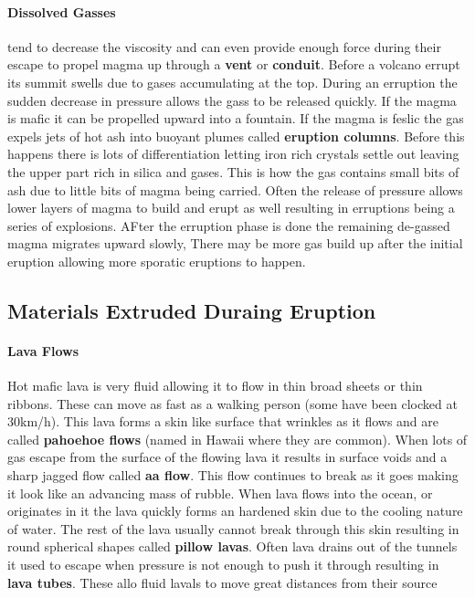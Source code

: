 \documentclass{article}
\begin{document}
\paragraph{Dissolved Gasses} %
\label{par:dissolved_gasses}
tend to decrease the viscosity and can even provide enough force during their escape to propel magma up through a \textbf{vent} or \textbf{conduit}. Before a volcano errupt its summit swells due to gases accumulating at the top. During an erruption the sudden decrease in pressure allows the gass to be released quickly. If the magma is mafic it can be propelled upward into a fountain. If the magma is feslic the gas expels jets of hot ash into buoyant plumes called \textbf{eruption columns}. Before this happens there is lots of differentiation letting iron rich crystals settle out leaving the upper part rich in silica and gases. This is how the gas contains small bits of ash due to little bits of magma being carried. Often the release of pressure allows lower layers of magma to build and erupt as well resulting in erruptions being a series of explosions. AFter the erruption phase is done the remaining de-gassed magma migrates upward slowly, There may be more gas build up after the initial eruption allowing more sporatic eruptions to happen.

\subsection*{Materials Extruded Duraing Eruption} %
\label{sub:materials_extruded_duraing_eruption}
\paragraph{Lava Flows} %
\label{par:lava_flows}
Hot mafic lava is very fluid allowing it to flow in thin broad sheets or thin ribbons. These can move as fast as a walking person (some have been clocked at 30km/h). This lava forms a skin like surface that wrinkles as it flows and are called \textbf{pahoehoe flows} (named in Hawaii where they are common). When lots of gas escape from the surface of the flowing lava it results in surface voids and a sharp jagged flow called \textbf{aa flow}. This flow continues to break as it goes making it look like an advancing mass of rubble. When lava flows into the ocean, or originates in it the lava quickly forms an hardened skin due to the cooling nature of water. The rest of the lava usually cannot break through this skin resulting in round spherical shapes called \textbf{pillow lavas}. Often lava drains out of the tunnels it used to escape when pressure is not enough to push it through resulting in \textbf{lava tubes}. These allo fluid lavals to move great distances from their source
\end{document}
